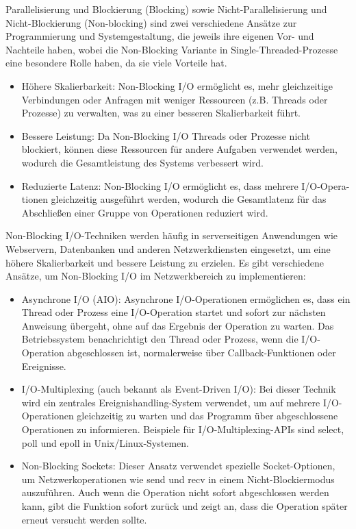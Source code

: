 Parallelisierung und Blockierung (Blocking) sowie Nicht-Parallelisierung und Nicht-Blockierung (Non-blocking) sind zwei verschiedene Ansätze zur Programmierung und Systemgestaltung, die jeweils ihre eigenen Vor- und Nachteile haben, wobei die Non-Blocking Variante in Single-Threaded-Prozesse eine besondere Rolle haben, da sie viele Vorteile hat. 
\begin{itemize}
\item Höhere Skalierbarkeit: Non-Blocking I/O ermöglicht es, mehr gleichzeitige Verbindungen oder Anfragen mit weniger Ressourcen (z.B. Threads oder Prozesse) zu verwalten, was zu einer besseren Skalierbarkeit führt.
\item Bessere Leistung: Da Non-Blocking I/O Threads oder Prozesse nicht blockiert, können diese Ressourcen für andere Aufgaben verwendet werden, wodurch die Gesamtleistung des Systems verbessert wird.
\item Reduzierte Latenz: Non-Blocking I/O ermöglicht es, dass mehrere I/O-Opera-tionen gleichzeitig ausgeführt werden, wodurch die Gesamtlatenz für das Abschließen einer Gruppe von Operationen reduziert wird.
\end{itemize}
Non-Blocking I/O-Techniken werden häufig in serverseitigen Anwendungen wie Webservern, Datenbanken und anderen Netzwerkdiensten eingesetzt, um eine höhere Skalierbarkeit und bessere Leistung zu erzielen. Es gibt verschiedene Ansätze, um Non-Blocking I/O im Netzwerkbereich zu implementieren:
\begin{itemize}
\item Asynchrone I/O (AIO): Asynchrone I/O-Operationen ermöglichen es, dass ein Thread oder Prozess eine I/O-Operation startet und sofort zur nächsten Anweisung übergeht, ohne auf das Ergebnis der Operation zu warten. Das Betriebssystem benachrichtigt den Thread oder Prozess, wenn die I/O-Operation abgeschlossen ist, normalerweise über Callback-Funktionen oder Ereignisse.
\item I/O-Multiplexing (auch bekannt als Event-Driven I/O): Bei dieser Technik wird ein zentrales Ereignishandling-System verwendet, um auf mehrere I/O-Operationen gleichzeitig zu warten und das Programm über abgeschlossene Operationen zu informieren. Beispiele für I/O-Multiplexing-APIs sind select, poll und epoll in Unix/Linux-Systemen.
\item Non-Blocking Sockets: Dieser Ansatz verwendet spezielle Socket-Optionen, um Netzwerkoperationen wie send und recv in einem Nicht-Blockiermodus auszuführen. Auch wenn die Operation nicht sofort abgeschlossen werden kann, gibt die Funktion sofort zurück und zeigt an, dass die Operation später erneut versucht werden sollte.
\end{itemize}
